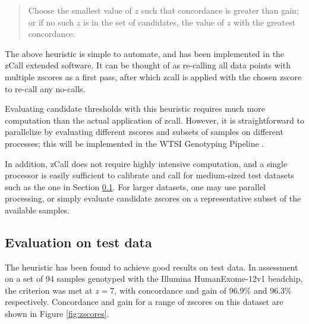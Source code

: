\documentclass{article}
\begin{document}
\begin{quote}Choose the smallest value of $z$ such that concordance is greater than gain; or if no such $z$ is in the set of candidates, the value of $z$ with the greatest concordance.
\end{quote}

The above heuristic is simple to automate, and has been implemented in the zCall extended software. It can be thought of as re-calling all data points with multiple zscores as a first pass, after which zcall is applied with the chosen zscore to re-call any no-calls.

Evaluating candidate thresholds with this heuristic requires much more computation than the actual application of zcall. However, it is straightforward to parallelize by evaluating different zscores and subsets of samples on different processes; this will be implemented in the WTSI Genotyping Pipeline \cite{wtsi-gp}. 

In addition, zCall does not require highly intensive computation, and a single processor is easily sufficient to calibrate and call for medium-sized test datasets such as the one in Section \ref{sec:evaluation}.  For larger datasets, one may use parallel processing, or simply evaluate candidate zscores on a representative subset of the available samples.

\subsection{Evaluation on test data}
\label{sec:evaluation}

The heuristic has been found to achieve good results on test data. In assessment on a set of 94 samples genotyped with the Illumina HumanExome-12v1 beadchip, the criterion was met at $z=7$, with concordance and gain of 96.9\% and 96.3\% respectively. Concordance and gain for a range of zscores on this dataset are shown in Figure \ref{fig:zscores}.
\end{document}
